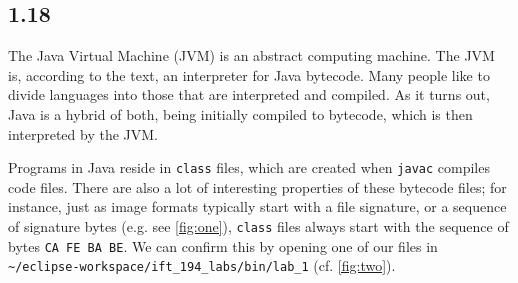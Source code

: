 \documentclass[leqno, 11pt]{article}
\begin{document}
\subsection*{1.18}
The Java Virtual Machine (JVM) is an abstract computing machine. The JVM is, according to the text, an interpreter for Java bytecode. Many people like to divide languages into those that are interpreted and compiled. As it turns out, Java is a hybrid of both, being initially compiled to bytecode, which is then interpreted by the JVM.

Programs in Java reside in \texttt{class} files, which are created when \texttt{javac} compiles code files. There are also a lot of interesting properties of these bytecode files; for instance, just as image formats typically start with a file signature, or a sequence of signature bytes (e.g. see \autoref{fig:one}), \texttt{class} files always start with the sequence of bytes \texttt{CA FE BA BE}. We can confirm this by opening one of our files in \texttt{\textasciitilde/eclipse-workspace/ift\_194\_labs/bin/lab\_1} (cf. \autoref{fig:two}).
\end{document}
